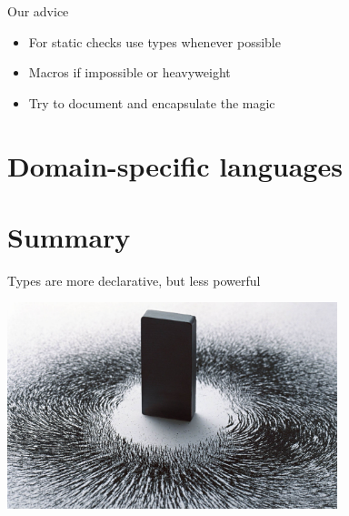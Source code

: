 \documentclass{beamer}
\begin{document}

\begin{frame}{Our advice}
  \begin{itemize}
  \item For static checks use types whenever possible
  \item Macros if impossible or heavyweight
  \item Try to document and encapsulate the magic
  \end{itemize}
\end{frame}

  \section{Domain-specific languages}

  \section{Summary}

\begin{frame}[fragile]{Types are more declarative, but less powerful}
  \begin{center}
    \includegraphics[height=6cm]{img/magnet.jpg}
  \end{center}
\end{frame}
\end{document}
